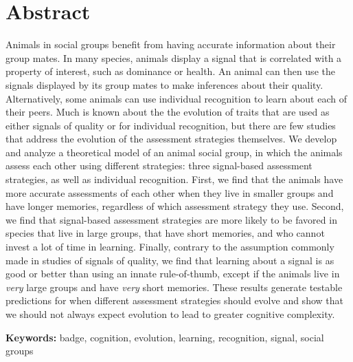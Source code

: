 \section*{Abstract}
Animals in social groups benefit from having accurate information about their group mates. In many species, animals display a signal that is correlated with a property of interest, such as dominance or health. An animal can then use the signals displayed by its group mates to make inferences about their quality. Alternatively, some animals can use individual recognition to learn about each of their peers. Much is known about the the evolution of traits that are used as either signals of quality or for individual recognition, but there are few studies that address the evolution of the assessment strategies themselves. We develop and analyze a theoretical model of an animal social group, in which the animals assess each other using different strategies: three signal-based assessment strategies, as well as individual recognition. First, we find that the animals have more accurate assessments of each other when they live in smaller groups and have longer memories, regardless of which assessment strategy they use. Second, we find that signal-based assessment strategies are more likely to be favored in species that live in large groups, that have short memories, and who cannot invest a lot of time in learning. Finally, contrary to the assumption commonly made in studies of signals of quality, we find that learning about a signal is as good or better than using an innate rule-of-thumb, except if the animals live in \emph{very} large groups and have \emph{very} short memories. These results generate testable predictions for when different assessment strategies should evolve and show that we should not always expect evolution to lead to greater cognitive complexity. 


\textbf{Keywords:} badge, cognition, evolution, learning, recognition, signal, social groups

\newpage
